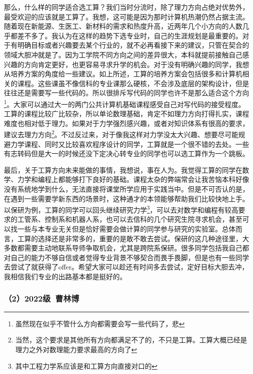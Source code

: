 \documentclass[11pt,oneside]{book}
\begin{document}
\vspace{10pt}

那么，什么样的同学适合选工算？我们当时分流时，除了理力方向占绝对优势外，最受欢迎的应该就是工算了。我想，这可能是因为那时计算机热潮仍然占据主流。随着现在新能源、生医工、新材料的需求和热度升高，近两年几个小方向的人数几乎都差不多了。我认为在这样的趋势下选专业时，自己的生涯规划是最重要的。对于有明确目标或者兴趣要去某个行业的，就不必再看接下来的建议，只管在契合的领域大胆冲就是了。因为工学院不同方向之间的差异很大，本科就提前接触自己感兴趣的方向肯定更好，也更容易寻求升学的机会。对于没有明确兴趣的同学，我想从培养方案的角度给一些建议。如上所述，工算的培养方案会包括很多和计算机相关的课程。这些课虽不像信科的专业课那么硬核，不会涉及底层的架构设计，但是往往还是需要写一些代码的。所以很排斥写代码的同学也许不是那么适合这个方向\footnote{虽然现在似乎不管什么方向都需要会写一些代码了，悲}。大家可以通过大一的两门公共计算机基础课程感受自己对写代码的接受程度。工算的课程比较广比较杂，所以单论数理基础，肯定不如理力方向打得扎实，课程难度也相对低于理力。如果对于力学强烈感兴趣，或者对知识体系有很高的要求，建议去理力方向\footnote{当然，这个要求是其他所有方向都满足不了的，不只是工算。工算大概已经是理力之外对数理能力要求最高的方向了}。不过反过来，对于像我这样对力学没太大兴趣、想要尽可能规避力学课程、同时又比较喜欢程序设计的同学，工算就是一个很不错的去处。一些有志转码但是大一的时候还没下定决心转专业的同学也可以选工算作为一个跳板。

\vspace{10pt}

最后，关于工算方向未来能做的事情，我想说，事在人为。我觉得工算的同学在数学、力学和编程上都能够打下良好的基础。课程太杂的弊端常会让我苦恼本科好像没有系统地学到什么，无法直接将课堂所学应用于实践当中。但是不可否认的是，在遇到一些需要学新东西的场景时，这种通才的本领能够帮助我们比较快地上手。以保研为例，工算的同学可以回头继续研究力学\footnote{其中工程力学系应该是和工算方向直接对口的}，可以去对数学和编程有较高要求的工管系、控制系和机器人系，也可以去信科的几个研究生院寻求机会，甚至可以找一些与本专业无关但是恰好需要会做计算的同学参与研究的实验室。总体而言，工算的选择还是非常多的，重要的是敢不敢去尝试。保研的这几种途径里，大多数都需要主动地联系导师争取机会，尤其是跨院系保研。很多同学包括我自己都对自己的能力不够自信或者觉得专业背景不够契合而畏手畏脚，但是也有一些同学去尝试了就获得了offer。希望大家可以趁还有时间多去尝试，定好目标大胆去冲，我相信我们专业的出路基本都是挺好的。
\subsubsection{（2）2022级\ 曹林博}
\end{document}
